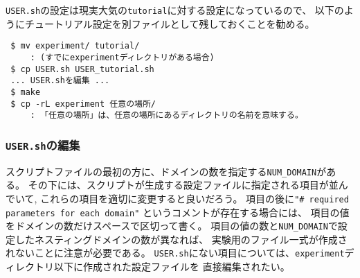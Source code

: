 \verb|USER.sh|の設定は現実大気の\verb|tutorial|に対する設定になっているので、
以下のようにチュートリアル設定を別ファイルとして残しておくことを勧める。
\begin{verbatim}
 $ mv experiment/ tutorial/    
     : (すでにexperimentディレクトリがある場合)
 $ cp USER.sh USER_tutorial.sh
 ... USER.shを編集 ...
 $ make
 $ cp -rL experiment 任意の場所/ 
     : 「任意の場所」は、任意の場所にあるディレクトリの名前を意味する。
\end{verbatim}


\subsubsection{\texttt{USER.sh}の編集}

スクリプトファイルの最初の方に、ドメインの数を指定する\verb|NUM_DOMAIN|がある。
その下には、スクリプトが生成する設定ファイルに指定される項目が並んでいて, 
これらの項目を適切に変更すると良いだろう。
項目の後に\verb|"# required parameters for each domain"| というコメントが存在する場合には、
項目の値をドメインの数だけスペースで区切って書く。
項目の値の数と\verb|NUM_DOMAIN|で設定したネスティングドメインの数が異なれば、
実験用のファイル一式が作成されないことに注意が必要である。
\verb|USER.sh|にない項目については、\verb|experiment|ディレクトリ以下に作成された設定ファイルを
直接編集されたい。

